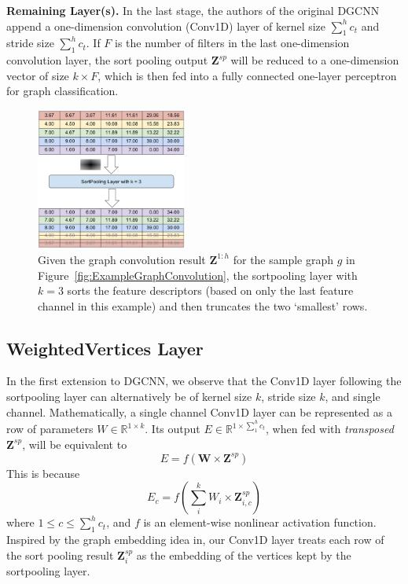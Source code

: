 \textbf{Remaining Layer(s).} In the last stage, the authors of the original DGCNN\cite{Dgcnn} append a one-dimension convolution (Conv1D) layer of kernel size $\sum_{1}^{h}c_t$ and stride size $\sum_{1}^{h}c_t$.
If $F$ is the number of filters in the last one-dimension convolution layer, the sort pooling output $\mathbf{Z}^{sp}$ will be reduced to a one-dimension vector of size $k \times F$, which is then fed into a fully connected one-layer perceptron for graph classification.

\begin{figure}[htbp]
\centerline{\includegraphics[width=0.44\textwidth]{Magic/figures/ExampleSortpool.eps}}
\caption{Given the graph convolution result $\mathbf{Z}^{1:h}$ for the sample graph $g$ in Figure~\ref{fig:ExampleGraphConvolution}, the sortpooling layer with $k = 3$ sorts the feature descriptors (based on only the last feature channel in this example) and then truncates the two `smallest' rows.}
\label{fig:ExampleSortpool}
\end{figure}

\subsection{WeightedVertices Layer}
In the first extension to DGCNN, we observe that the Conv1D layer following the sortpooling layer can alternatively be of kernel size $k$, stride size $k$, and single channel.
Mathematically, a single channel Conv1D layer can be represented as a row of parameters $W \in \mathbb{R}^{1 \times k}$.
Its output $E \in \mathbb{R}^{1 \times \sum_{1}^{h}c_t}$, when fed with \textit{transposed} $\mathbf{Z}^{sp}$, will be equivalent to
\begin{equation}
    E = f(\mathbf{W} \times \mathbf{Z}^{sp})
\label{equ:WeightedVertices}
\end{equation}
This is because
\begin{equation}
    E_c = f(\sum_{i}^{k} W_i \times \mathbf{Z}^{sp}_{i, c})
\end{equation}
where $1\leq c \leq \sum_{1}^{h}c_t$, and $f$ is an element-wise nonlinear activation function.
Inspired by the graph embedding idea in\cite{GraphEmbedding}, our Conv1D layer treats each row of the sort pooling result $\mathbf{Z}^{sp}_{i}$ as the embedding of the vertices kept by the sortpooling layer.

